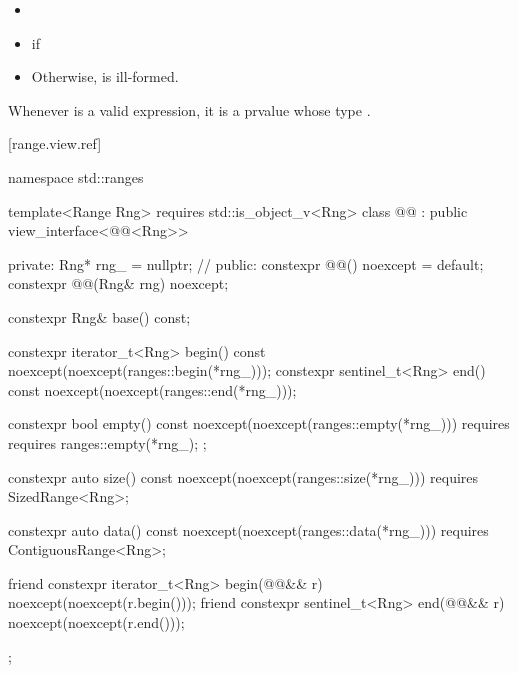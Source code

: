 {\begin{itemize}
\item {}

\item {}  if  

\item Otherwise,  is ill-formed.
\end{itemize}

\begin{note}
Whenever  is a valid expression, it is a prvalue
whose type   .
\end{note}

{\color{newclr}
[range.view.ref]{}

\begin{codeblock}
namespace std::ranges {
  template<Range Rng>
    requires std::is_object_v<Rng>
  class @@ : public view_interface<@@<Rng>> {
  private:
    Rng* rng_ = nullptr; // \expos
  public:
    constexpr @@() noexcept = default;
    constexpr @@(Rng& rng) noexcept;

    constexpr Rng& base() const;

    constexpr iterator_t<Rng> begin() const
      noexcept(noexcept(ranges::begin(*rng_)));
    constexpr sentinel_t<Rng> end() const
      noexcept(noexcept(ranges::end(*rng_)));

    constexpr bool empty() const
      noexcept(noexcept(ranges::empty(*rng_)))
      requires requires { ranges::empty(*rng_); };

    constexpr auto size() const
      noexcept(noexcept(ranges::size(*rng_)))
      requires SizedRange<Rng>;

    constexpr auto data() const
      noexcept(noexcept(ranges::data(*rng_)))
      requires ContiguousRange<Rng>;

    friend constexpr iterator_t<Rng> begin(@@&& r)
      noexcept(noexcept(r.begin()));
    friend constexpr sentinel_t<Rng> end(@@&& r)
      noexcept(noexcept(r.end()));
  };
}
\end{codeblock}

}}

